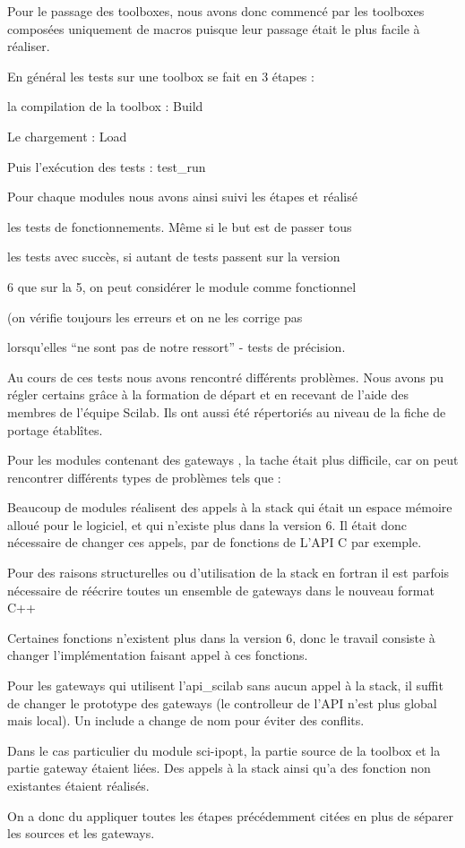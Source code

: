 Pour le passage des toolboxes, nous avons donc commencé par les toolboxes composées uniquement de macros puisque leur passage était le plus facile à réaliser.

En général les tests sur une toolbox se fait en 3 étapes :

la compilation de la toolbox : Build

Le chargement : Load

Puis l'exécution des tests : test\_run

Pour chaque modules nous avons ainsi suivi les étapes et réalisé

les tests de fonctionnements. Même si le but est de passer tous

les tests avec succès, si autant de tests passent sur la version

6 que sur la 5, on peut considérer le module comme fonctionnel

(on vérifie toujours les erreurs et on ne les corrige pas

lorsqu’elles “ne sont pas de notre ressort” - tests de précision.

Au cours de ces tests nous avons rencontré différents problèmes. Nous avons pu régler certains grâce  à la  formation de départ et en recevant de l’aide des membres de l'équipe Scilab. Ils ont aussi été répertoriés au niveau de la fiche de portage établîtes.

Pour les modules contenant des gateways , la tache était plus difficile, car on peut rencontrer différents types de problèmes tels que :

Beaucoup de modules réalisent des appels à la stack qui était un espace mémoire alloué pour le logiciel, et qui n’existe plus dans la version 6. Il était donc nécessaire de changer ces appels, par de fonctions de L’API C par exemple.

Pour des raisons structurelles ou d’utilisation de la stack en fortran il est parfois nécessaire de réécrire toutes un ensemble de gateways dans le nouveau format C++

Certaines fonctions n’existent plus dans la version 6, donc le travail consiste à changer l’implémentation faisant appel à ces fonctions. 

Pour les gateways qui utilisent l’api\_scilab sans aucun appel à la stack, il suffit de changer le prototype des gateways (le controlleur de l’API n’est plus global mais local). Un include a change de nom pour éviter des conflits.

Dans le cas particulier du module sci-ipopt, la partie source de la toolbox et la partie gateway étaient liées. Des appels à la stack ainsi qu’a des fonction non existantes étaient réalisés. 

On a donc du appliquer toutes les étapes précédemment citées en plus de séparer les sources et les gateways.

